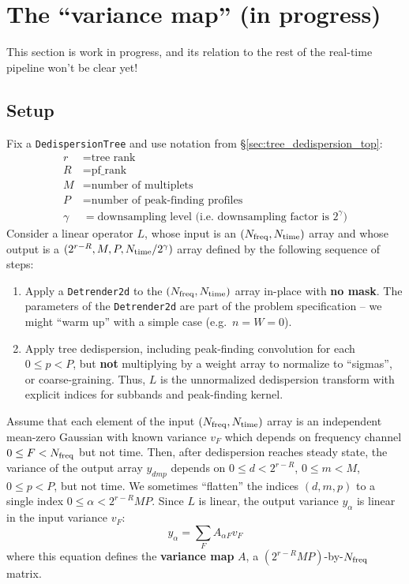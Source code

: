 \documentclass{article}
\numberwithin{equation}{section}   %
\begin{document}
\clearpage

\section{The ``variance map'' (in progress)}
\label{sec:variance_map}

This section is work in progress, and its relation to the rest of the real-time
pipeline won't be clear yet!

\subsection{Setup}
\label{ssec:variance_map_setup}

Fix a {\tt DedispersionTree} and use notation from \S\ref{sec:tree_dedispersion_top}:
\begin{align}
r &= \mbox{tree rank} \\
R &= \mbox{pf\_rank} \\
M &= \mbox{number of multiplets} \\
P &= \mbox{number of peak-finding profiles} \\
\gamma &= \mbox{downsampling level (i.e.\ downsampling factor is $2^\gamma$)}
\end{align}
Consider a linear operator $L$, whose input is an $(N_{\rm freq}, N_{\rm time})$ array
and whose output is a $(2^{r-R}, M, P, N_{\rm time}/2^\gamma)$ array defined by the
following sequence of steps:
\begin{enumerate}
\item Apply a {\tt Detrender2d} to the $(N_{\rm freq}, N_{\rm time})$ array
  in-place with {\bf no mask}. The parameters of the {\tt Detrender2d} are
  part of the problem specification -- we might ``warm up'' with a simple
  case (e.g.\ $n=W=0$).
\item Apply tree dedispersion, including peak-finding convolution for each $0 \le p < P$, 
  but {\bf not} multiplying by a weight array to normalize to ``sigmas'', or coarse-graining.
  Thus, $L$ is the unnormalized dedispersion transform with explicit indices for subbands
  and peak-finding kernel.
\end{enumerate}
Assume that each element of the input $(N_{\rm freq}, N_{\rm time})$ array is an independent
mean-zero Gaussian with known variance $v_F$ which depends on frequency channel
$0 \le F < N_{\rm freq}$ but not time.
Then, after dedispersion reaches steady state, the variance of the output array $y_{dmp}$
depends on $0 \le d < 2^{r-R}$, $0 \le m < M$, $0 \le p < P$, but not time.
We sometimes ``flatten'' the indices $(d,m,p)$ to a single index $0 \le \alpha < 2^{r-R}MP$.
Since $L$ is linear, the output variance $y_\alpha$ is linear in the input variance $v_F$:
\begin{equation}
y_\alpha = \sum_F A_{\alpha F} v_F  \label{eq:variance_map_def}
\end{equation}
where this equation defines the {\bf variance map} $A$, a $(2^{r-R}MP)$-by-$N_{\rm freq}$ matrix.
\end{document}
